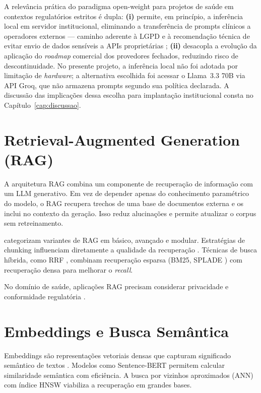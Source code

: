 \documentclass[
  12pt,
  oneside,
  a4paper,
  english,
  brazil
]{abntex2}
\begin{document}
A relevância prática do paradigma open-weight para projetos de saúde em
contextos regulatórios estritos é dupla: \textbf{(i)} permite, em princípio, a
inferência local em servidor institucional, eliminando a transferência de prompts
clínicos a operadores externos --- caminho aderente à LGPD e à recomendação técnica
de evitar envio de dados sensíveis a APIs proprietárias \cite{lgpdSaude2023,
privacyRAGHealthcare2025}; \textbf{(ii)} desacopla a evolução da aplicação do
\textit{roadmap} comercial dos provedores fechados, reduzindo risco de
descontinuidade. No presente projeto, a inferência local não foi adotada por
limitação de \textit{hardware}; a alternativa escolhida foi acessar o Llama~3.3 70B
via API Groq, que não armazena prompts segundo sua política declarada. A discussão
das implicações dessa escolha para implantação institucional consta no
Capítulo~\ref{cap:discussao}.

\section{Retrieval-Augmented Generation (RAG)}

A arquitetura RAG \cite{lewis2021} combina um componente de recuperação de informação
com um LLM generativo. Em vez de depender apenas do conhecimento paramétrico do
modelo, o RAG recupera trechos de uma base de documentos externa e os inclui no
contexto da geração. Isso reduz alucinações e permite atualizar o corpus sem
retreinamento.

\citeauthor{gao2024} \cite{gao2024} categorizam variantes de RAG em básico,
avançado e modular. Estratégias de chunking influenciam diretamente a
qualidade da recuperação \cite{advancedChunkingRAG2025}. Técnicas de busca híbrida,
como RRF \cite{cormack2009}, combinam recuperação esparsa (BM25, SPLADE
\cite{formal2021}) com recuperação densa para melhorar o \textit{recall}.

No domínio de saúde, aplicações RAG precisam considerar privacidade e conformidade
regulatória \cite{privacyRAGHealthcare2025, privacyEHRLLMs2025}.

\section{Embeddings e Busca Semântica}

Embeddings são representações vetoriais densas que capturam significado semântico
de textos \cite{boykis2024}. Modelos como Sentence-BERT \cite{reimers2019} permitem
calcular similaridade semântica com eficiência. A busca por vizinhos aproximados
(ANN) com índice HNSW \cite{malkov2016} viabiliza a recuperação em grandes bases.
\end{document}
